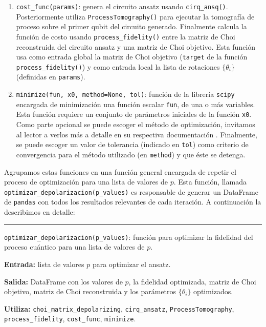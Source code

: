 \documentclass[letterpaper,12pt]{thesisECFM}
\theoremstyle{plain}
\theoremstyle{definition}
\theoremstyle{remark}
\newcommand{\1}{\mathbb{1}}
\begin{document}
\begin{enumerate}
    \item \texttt{cost\_func(params)}: genera el circuito ansatz usando
\texttt{cirq\_ansq()}. Posteriormente utiliza \texttt{ProcessTomography()} para
ejecutar la tomografía de proceso sobre el primer qubit del circuito generado.
Finalmente calcula la función de costo usando \texttt{process\_fidelity()}
entre la matriz de Choi reconstruida del circuito ansatz y una matriz de Choi
objetivo. Esta función usa como entrada global la matriz de Choi objetivo
(\texttt{target} de la función \texttt{process\_fidelity()}) y como entrada
local la lista de rotaciones $\{\theta_i\}$ (definidas en  \texttt{params}).

    \item \texttt{minimize(fun, x0, method=None, tol)}: función de la librería
\texttt{scipy} encargada de minimización una función escalar \texttt{fun}, de
una o más variables. Esta función requiere un conjunto de parámetros iniciales
de la función \texttt{x0}. Como parte opcional se puede escoger el método de
optimización, invitamos al lector a verlos más a detalle en su respectiva
documentación \cite{scipy}. Finalmente, se puede escoger un valor de tolerancia
(indicado en \texttt{tol})  como criterio de convergencia para el método
utilizado (en \texttt{method}) y que éste se detenga.
    
\end{enumerate}

Agrupamos estas funciones en una función general encargada de repetir el
proceso de optimización para una lista de valores de $p$. Esta función, llamada
\texttt{optimizar\_depolarizacion(p\_values)} es responsable de generar un
DataFrame de \texttt{pandas} con todos los resultados relevantes de cada
iteración. A continuación la describimos en detalle:

\noindent\rule{\textwidth}{1mm}
\texttt{optimizar\_depolarizacion(p\_values)}: función para optimizar la
fidelidad del proceso cuántico para una lista de valores de $p$. \newline

\noindent\textbf{Entrada:} lista de valores $p$ para optimizar el ansatz.

\noindent\textbf{Salida:} DataFrame con los valores de $p$, la fidelidad
optimizada, matriz de Choi objetivo, matriz de Choi reconstruida y los
parámetros $\{\theta_i\}$ optimizados.

\noindent\textbf{Utiliza:} \texttt{choi\_matrix\_depolarizing},
\texttt{cirq\_ansatz}, \texttt{ProcessTomography}, \texttt{process\_fidelity},
\texttt{cost\_func}, \texttt{minimize}. \newline
\end{document}
